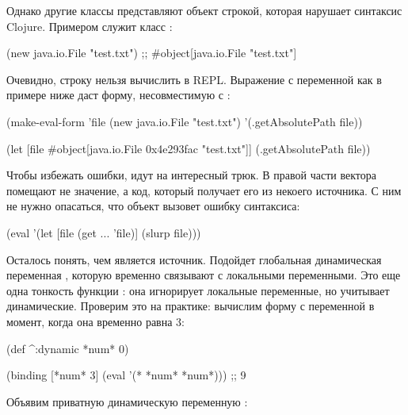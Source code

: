 Однако другие классы представляют объект строкой, которая нарушает синтаксис Clojure. Примером служит класс :

\begin{english}
  \begin{clojure}
(new java.io.File "test.txt")
;; #object[java.io.File "test.txt"]
  \end{clojure}
\end{english}

Очевидно, строку  нельзя вычислить в REPL. Выражение с переменной  как в примере ниже даст форму, несовместимую с :

\begin{english}
  \begin{clojure}
(make-eval-form
 {'file (new java.io.File "test.txt")}
 '(.getAbsolutePath file))

(let [file #object[java.io.File 0x4e293fac "test.txt"]]
  (.getAbsolutePath file))
  \end{clojure}
\end{english}

Чтобы избежать ошибки, идут на интересный трюк. В правой части вектора  помещают не значение, а код, который получает его из некоего источника. С ним не нужно опасаться, что объект  вызовет ошибку синтаксиса:

\begin{english}
  \begin{clojure}
(eval '(let [file (get ... 'file)]
         (slurp file)))
  \end{clojure}
\end{english}

Осталось понять, чем является источник. Подойдет глобальная динамическая переменная , которую временно связывают с локальными переменными. Это еще одна тонкость функции : она игнорирует локальные переменные, но учитывает динамические. Проверим это на практике: вычислим форму с переменной  в момент, когда она временно равна 3:

\begin{english}
  \begin{clojure}
(def ^:dynamic *num* 0)

(binding [*num* 3]
  (eval '(* *num* *num*)))
;; 9
  \end{clojure}
\end{english}

Объявим приватную динамическую переменную :

